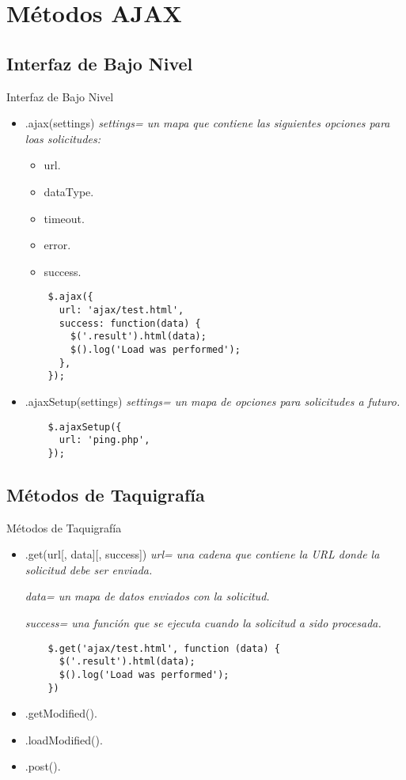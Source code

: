 \section{Métodos AJAX} %

\subsection{Interfaz de Bajo Nivel} %

\begin{frame}[fragile]{Interfaz de Bajo Nivel} %
\begin{itemize}
    \item .ajax(settings) \textit{ settings= un mapa que contiene las siguientes opciones para loas solicitudes:}
    \begin{itemize}
      \item url.
      \item dataType.
      \item timeout.
      \item error.
      \item success.
    \end{itemize}
    \begin{lstlisting}
    $.ajax({
      url: 'ajax/test.html', 
      success: function(data) {
        $('.result').html(data);
        $().log('Load was performed');
      }, 
    });
    \end{lstlisting}
    \item .ajaxSetup(settings) \textit{ settings= un mapa de opciones para
    solicitudes a futuro.} 
    \begin{lstlisting}
    $.ajaxSetup({
      url: 'ping.php', 
    });
    \end{lstlisting}
\end{itemize}
\end{frame}

\subsection{Métodos de Taquigrafía} %

\begin{frame}[fragile]{Métodos de Taquigrafía} %
\begin{itemize}
    \item .get(url[, data][, success]) \textit{ url= una cadena que contiene la URL donde la solicitud debe ser enviada.}

    \textit{ data= un mapa de datos enviados con la solicitud.}

    \textit{ success= una función que se ejecuta cuando la solicitud a sido procesada.}
    \begin{lstlisting}
    $.get('ajax/test.html', function (data) {
      $('.result').html(data);
      $().log('Load was performed');
    })
    \end{lstlisting}
    \item .getModified().
    \item .loadModified().
    \item .post().
\end{itemize}
\end{frame}

